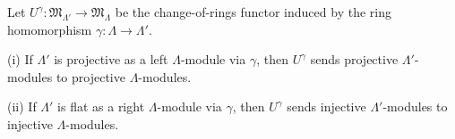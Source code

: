 Let $U^\gamma : \mathfrak{M}_{\Lambda'} \rightarrow \mathfrak{M}_\Lambda$ be the change-of-rings functor induced by the ring homomorphism $\gamma : \Lambda \rightarrow \Lambda'$.

(i) If $\Lambda'$ is projective as a left $\Lambda$-module via $\gamma$, then $U^\gamma$ sends projective $\Lambda'$-modules to projective $\Lambda$-modules.

(ii) If $\Lambda'$ is flat as a right $\Lambda$-module via $\gamma$, then $U^\gamma$ sends injective $\Lambda'$-modules to injective $\Lambda$-modules.
